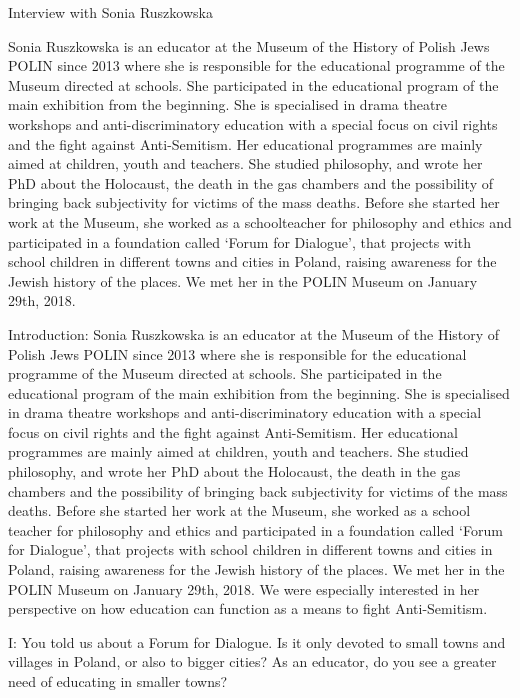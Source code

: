 Interview with Sonia Ruszkowska

Sonia Ruszkowska is an educator at the Museum of the History of Polish Jews POLIN since 2013 where she is responsible for the educational programme of the Museum directed at schools. She participated in the educational program of the main exhibition from the beginning. She is specialised in drama theatre workshops and anti-discriminatory education with a special focus on civil rights and the fight against Anti-Semitism. Her educational programmes are mainly aimed at children, youth and teachers. She studied philosophy, and wrote her PhD about the Holocaust, the death in the gas chambers and the possibility of bringing back subjectivity for victims of the mass deaths. Before she started her work at the Museum, she worked as a schoolteacher for philosophy and ethics and participated in a foundation called ‘Forum for Dialogue’, that projects with school children in different towns and cities in Poland, raising awareness for the Jewish history of the places. We met her in the POLIN Museum on January 29th, 2018.  

Introduction: Sonia Ruszkowska is an educator at the Museum of the History of Polish Jews POLIN since 2013 where she is responsible for the educational programme of the Museum directed at schools. She participated in the educational program of the main exhibition from the beginning. She is specialised in drama theatre workshops and anti-discriminatory education with a special focus on civil rights and the fight against Anti-Semitism. Her educational programmes are mainly aimed at children, youth and teachers. 
She studied philosophy, and wrote her PhD about the Holocaust, the death in the gas chambers and the possibility of bringing back subjectivity for victims of the mass deaths. Before she started her work at the Museum, she worked as a school teacher for philosophy and ethics and participated in a foundation called ‘Forum for Dialogue’, that projects with school children in different towns and cities in Poland, raising awareness for the Jewish history of the places. 
We met her in the POLIN Museum on January 29th, 2018. We were especially interested in her perspective on how education can function as a means to fight Anti-Semitism. 

 

I: You told us about a Forum for Dialogue. Is it only devoted to small towns and villages in Poland, or also to bigger cities? As an educator, do you see a greater need of educating in smaller towns? 


